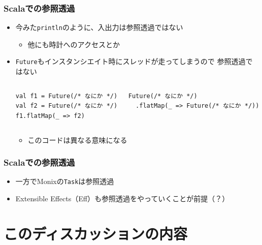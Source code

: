 \begin{frame}[fragile]
  \frametitle{Scalaでの参照透過}

  \begin{itemize}
    \item<+-> 今みた\lstinline|println|のように、入出力は参照透過ではない
    \begin{itemize}
      \item 他にも時計へのアクセスとか
    \end{itemize}

    \item<+-> \lstinline|Future|もインスタンシエイト時にスレッドが走ってしまうので
    参照透過ではない
    \begin{columns}
      \begin{column}{0.4\textwidth}
\begin{lstlisting}[style=scala]
val f1 = Future(/* なにか */)
val f2 = Future(/* なにか */)
f1.flatMap(_ => f2)
\end{lstlisting}
    \end{column}
    \begin{column}{0.4\textwidth}
\begin{lstlisting}[style=scala]
Future(/* なにか */)
  .flatMap(_ => Future(/* なにか */))
\end{lstlisting}
      \end{column}
    \end{columns}
    \begin{itemize}
      \item このコードは異なる意味になる
    \end{itemize}
  \end{itemize}
\end{frame}

\begin{frame}[fragile]
  \frametitle{Scalaでの参照透過}

  \begin{itemize}
    \item<+-> 一方でMonixの\lstinline|Task|\cite{monix_task}は参照透過

    \item<+-> Extensible Effects（Eff）も参照透過をやっていくことが前提（？）
  \end{itemize}
\end{frame}

\section{このディスカッションの内容}

